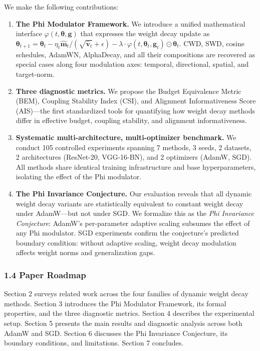 \documentclass[
]{article}
\begin{document}
We make the following contributions:

\begin{enumerate}
\def\labelenumi{\arabic{enumi}.}
\item
  \textbf{The Phi Modulator Framework.} We introduce a unified
  mathematical interface \(\varphi(t, \boldsymbol{\theta}, \mathbf{g})\)
  that expresses the weight decay update as
  \(\boldsymbol{\theta}_{t+1} = \boldsymbol{\theta}_t - \eta_t \hat{\mathbf{m}}_t / (\sqrt{\hat{\mathbf{v}}_t} + \epsilon) - \lambda \cdot \varphi(t, \boldsymbol{\theta}_t, \mathbf{g}_t) \odot \boldsymbol{\theta}_t\).
  CWD, SWD, cosine schedules, AdamWN, AlphaDecay, and all their
  compositions are recovered as special cases along four modulation
  axes: temporal, directional, spatial, and target-norm.
\item
  \textbf{Three diagnostic metrics.} We propose the Budget Equivalence
  Metric (BEM), Coupling Stability Index (CSI), and Alignment
  Informativeness Score (AIS)---the first standardized tools for
  quantifying how weight decay methods differ in effective budget,
  coupling stability, and alignment informativeness.
\item
  \textbf{Systematic multi-architecture, multi-optimizer benchmark.} We
  conduct 105 controlled experiments spanning 7 methods, 3 seeds, 2
  datasets, 2 architectures (ResNet-20, VGG-16-BN), and 2 optimizers
  (AdamW, SGD). All methods share identical training infrastructure and
  base hyperparameters, isolating the effect of the Phi modulator.
\item
  \textbf{The Phi Invariance Conjecture.} Our evaluation reveals that
  all dynamic weight decay variants are statistically equivalent to
  constant weight decay under AdamW---but not under SGD. We formalize
  this as the \emph{Phi Invariance Conjecture}: AdamW's per-parameter
  adaptive scaling subsumes the effect of any Phi modulator. SGD
  experiments confirm the conjecture's predicted boundary condition:
  without adaptive scaling, weight decay modulation affects weight norms
  and generalization gaps.
\end{enumerate}

\hypertarget{paper-roadmap}{%
\subsubsection{1.4 Paper Roadmap}\label{paper-roadmap}}

Section 2 surveys related work across the four families of dynamic
weight decay methods. Section 3 introduces the Phi Modulator Framework,
its formal properties, and the three diagnostic metrics. Section 4
describes the experimental setup. Section 5 presents the main results
and diagnostic analysis across both AdamW and SGD. Section 6 discusses
the Phi Invariance Conjecture, its boundary conditions, and limitations.
Section 7 concludes.
\end{document}
